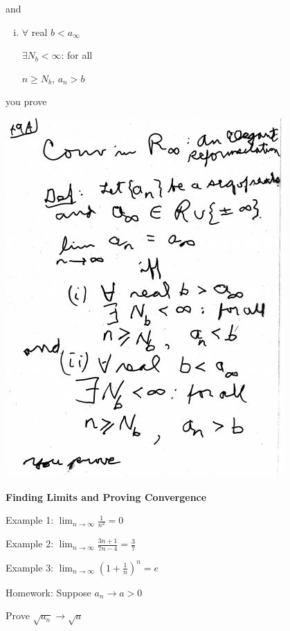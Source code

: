 \documentclass[10pt,a4paper]{article}
\begin{document}
{{and

\begin{enumerate} [(ii)]

\item $\forall$ real $b < a_{\infty}$

$\exists N_{b} < \infty$: for all

$n \geq N_{b}$, $a_{n} > b$

\end{enumerate}

you prove

\includegraphics[scale=.7]{Pages/S&L_page49(2)}

\newpage


{\bf Finding Limits and Proving Convergence}

Example 1: $\lim_{n \rightarrow \infty} \frac{1}{n^{2}} = 0$

Example 2: $\lim_{n \rightarrow \infty} \frac{3n+1}{7n-4} = \frac{3}{7}$

Example 3: $\lim_{n \rightarrow \infty} (1 + \frac{1}{n})^{n} = e$

Homework: Suppose $a_{n} \rightarrow a > 0$


Prove $\sqrt{a_{n}} \rightarrow \sqrt{a}$

}}
\end{document}
